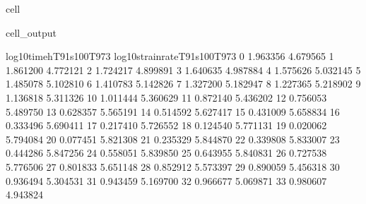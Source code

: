 \documentclass[letterpaper,10pt,english]{jupyterBook}
\begin{document}
\begin{sphinxuseclass}{cell}
\begin{sphinxVerbatimOutput}
\begin{sphinxuseclass}{cell_output}
\begin{sphinxVerbatim}[commandchars=\\\{\}]
					log10timeh\PYGZus{}T91s100T973  log10strainrate\PYGZus{}T91s100T973  
					0                \PYGZhy{}1.963356                    \PYGZhy{}4.679565  
					1                \PYGZhy{}1.861200                    \PYGZhy{}4.772121  
					2                \PYGZhy{}1.724217                    \PYGZhy{}4.899891  
					3                \PYGZhy{}1.640635                    \PYGZhy{}4.987884  
					4                \PYGZhy{}1.575626                    \PYGZhy{}5.032145  
					5                \PYGZhy{}1.485078                    \PYGZhy{}5.102810  
					6                \PYGZhy{}1.410783                    \PYGZhy{}5.142826  
					7                \PYGZhy{}1.327200                    \PYGZhy{}5.182947  
					8                \PYGZhy{}1.227365                    \PYGZhy{}5.218902  
					9                \PYGZhy{}1.136818                    \PYGZhy{}5.311326  
					10               \PYGZhy{}1.011444                    \PYGZhy{}5.360629  
					11               \PYGZhy{}0.872140                    \PYGZhy{}5.436202  
					12               \PYGZhy{}0.756053                    \PYGZhy{}5.489750  
					13               \PYGZhy{}0.628357                    \PYGZhy{}5.565191  
					14               \PYGZhy{}0.514592                    \PYGZhy{}5.627417  
					15               \PYGZhy{}0.431009                    \PYGZhy{}5.658834  
					16               \PYGZhy{}0.333496                    \PYGZhy{}5.690411  
					17               \PYGZhy{}0.217410                    \PYGZhy{}5.726552  
					18               \PYGZhy{}0.124540                    \PYGZhy{}5.771131  
					19               \PYGZhy{}0.020062                    \PYGZhy{}5.794084  
					20                0.077451                    \PYGZhy{}5.821308  
					21                0.235329                    \PYGZhy{}5.844870  
					22                0.339808                    \PYGZhy{}5.833007  
					23                0.444286                    \PYGZhy{}5.847256  
					24                0.558051                    \PYGZhy{}5.839850  
					25                0.643955                    \PYGZhy{}5.840831  
					26                0.727538                    \PYGZhy{}5.776506  
					27                0.801833                    \PYGZhy{}5.651148  
					28                0.852912                    \PYGZhy{}5.573397  
					29                0.890059                    \PYGZhy{}5.456318  
					30                0.936494                    \PYGZhy{}5.304531  
					31                0.943459                    \PYGZhy{}5.169700  
					32                0.966677                    \PYGZhy{}5.069871  
					33                0.980607                    \PYGZhy{}4.943824  

\end{sphinxVerbatim}
\end{sphinxuseclass}
\end{sphinxVerbatimOutput}
\end{sphinxuseclass}
\end{document}
